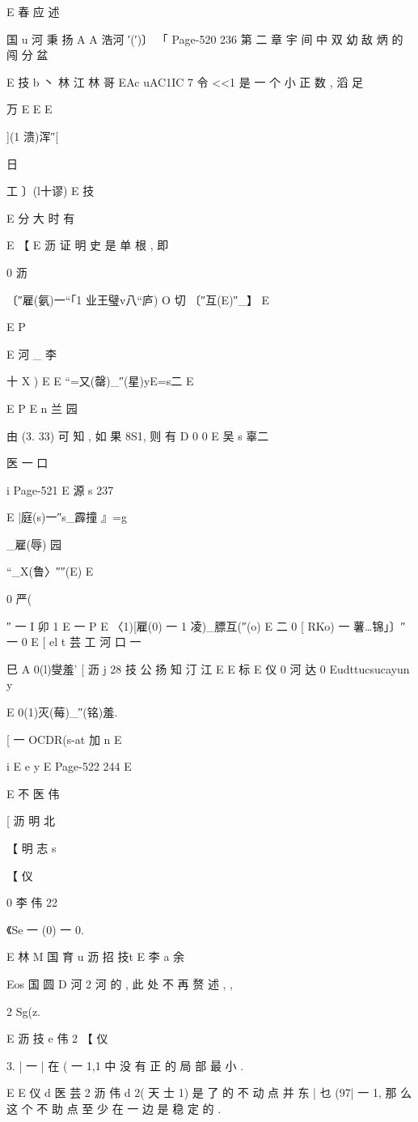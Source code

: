 {{{{E 春 应 述

国 u 河 秉 扬 A
A 浩河 ′(′)〕 「
Page-520
236 第 二 章 宇 间 中 双 幼 敌 炳 的 闯 分 盆

E 技 b 丶 林 江
林
哥 EAc uAC1IC 7
令 <<1 是 一 个 小 正 数 , 滔 足

万 E
E
E

](1 溃)浑″[

日

工 〕(l十谬) E 技

E
分 大 时 有

E 【
E 沥
证 明 史 是 单 根 , 即

0 沥

〔″雇(氨)一“「1 业王璧v八“庐) O 切 〔″互(E)″_】 E

E P

E 河 _ 李

十 X ) E E “=又(罄)_″(星)yE=s二
E

E P E
n 兰 园

由 (3. 33) 可 知 , 如 果 8S1, 则 有
D
0 0 E 吴 s 辜二

医 一 口

i
Page-521
E 源 s 237

E |庭(s)一″s_霹撞 』=g

_雇(辱) 园

“_X(鲁〉″″(E) E

0
严(

″ 一 I 卯 1
E 一 P E
〈1)[雇(0) 一 1 凌)_膘互(″(o) E
二 0 [ RKo) 一 薯…锦」〕″ 一 0
E
[ el t
芸 工 河 口 一

巳 A 0(l)燮羞' [ 沥
j 28 技 公 扬 知 汀 江
E
E 标
E 仪 0 河 达 0
Eudttucsucayun y

E 0(1)灭(莓)_″(铭)羞.

[
一 OCDR(s-at 加 n
E

i
E e y
E
Page-522
244 E

E 不 医 伟

[ 沥 明 北

【 明 志 s

【 仪

0 李 伟 22

《Se 一 (0) 一 0.

E 林 M 国 育 u 沥 招 技t
E 李 a 余

Eos 国 圆 D 河 2 河
的 , 此 处 不 再 赘 述 , ,

2
Sg(z.

E 沥 技 e 伟 2
【 仪

3. | 一 | 在 ( 一 1,1 中 没 有 正 的 局 部 最 小 .

E
E 仪 d
医 芸 2 沥 伟
d
2( 天 士 1) 是 了 的 不 动 点 并 东 | 乜 (97| 一 1, 那 么 这 个 不 助 点 至 少
在 一 边 是 稳 定 的 .

}}}}
